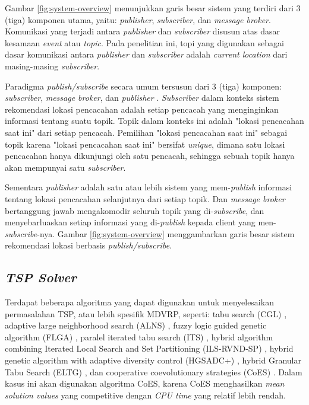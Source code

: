 Gambar \ref{fig:system-overview} menunjukkan garis besar sistem yang terdiri dari 3 (tiga) komponen utama, yaitu: \textit{publisher}, \textit{subscriber}, dan \textit{message broker}. Komunikasi yang terjadi antara \textit{publisher} dan \textit{subscriber} disusun atas dasar kesamaan \textit{event} atau \textit{topic}. Pada penelitian ini, topi yang digunakan sebagai dasar komunikasi antara \textit{publisher} dan \textit{subscriber} adalah \textit{current location} dari masing-masing \textit{subscriber}.


Paradigma \textit{publish/subscribe} secara umum tersusun dari 3 (tiga) komponen: \textit{subscriber}, \textit{message broker}, dan \textit{publisher} \citep{banavar_efficient_1999}. \textit{Subscriber} dalam konteks sistem rekomendasi lokasi pencacahan adalah setiap pencacah yang menginginkan informasi tentang suatu topik. Topik dalam konteks ini adalah "lokasi pencacahan saat ini" dari setiap pencacah. Pemilihan "lokasi pencacahan saat ini" sebagai topik karena "lokasi pencacahan saat ini" bersifat \textit{unique}, dimana satu lokasi pencacahan hanya dikunjungi oleh satu pencacah, sehingga sebuah topik hanya akan mempunyai satu \textit{subscriber}.


Sementara \textit{publisher} adalah satu atau lebih sistem yang mem-\textit{publish} informasi tentang lokasi pencacahan selanjutnya dari setiap topik. Dan \textit{message broker} bertanggung jawab mengakomodir seluruh topik yang di-\textit{subscribe}, dan menyebarluaskan setiap informasi yang di-\textit{publish} kepada client yang men-\textit{subscribe}-nya. Gambar \ref{fig:system-overview} menggambarkan garis besar sistem rekomendasi lokasi berbasis \textit{publish/subscribe}.


\subsection{\textit{TSP Solver}}
Terdapat beberapa algoritma yang dapat digunakan untuk menyelesaikan permasalahan TSP, atau lebih spesifik MDVRP, seperti: tabu search (CGL) \citep{cordeau_tabu_1997}, adaptive large neighborhood search (ALNS) \citep{pisinger_general_2007}, fuzzy logic guided genetic algorithm (FLGA) \citep{lau_application_2010}, paralel iterated tabu search (ITS) \citep{cordeau_parallel_2012}, hybrid algorithm combining Iterated Local Search and Set Partitioning (ILS-RVND-SP) \citep{subramanian_hybrid_2013}, hybrid genetic algorithm with adaptive diversity control (HGSADC+) \citep{vidal_implicit_2014}, hybrid Granular Tabu Search (ELTG) \citep{escobar_hybrid_2014}, dan cooperative coevolutionary strategies (CoES) \citep{de_oliveira_cooperative_2016}. Dalam kasus ini akan digunakan algoritma CoES, karena CoES menghasilkan \textit{mean solution values} yang competitive dengan \textit{CPU time} yang relatif lebih rendah.


